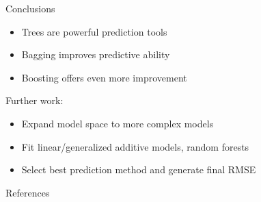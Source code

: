 \documentclass{beamer}
\begin{document}
	\begin{frame}{Conclusions}
		\begin{itemize}
			\item Trees are powerful prediction tools
			\item Bagging improves predictive ability
			\item Boosting offers even more improvement
		\end{itemize}
		Further work:
		\begin{itemize}
			\item Expand model space to more complex models
			\item Fit linear/generalized additive models, random forests
			\item Select best prediction method and generate final RMSE
		\end{itemize}
	\end{frame}

	\begin{frame}{References}

	\end{frame}
	
\end{document}
